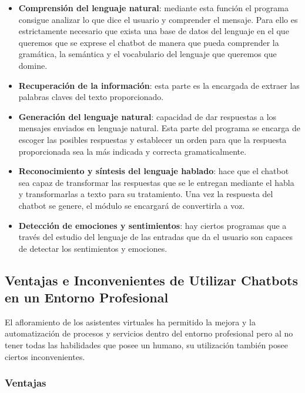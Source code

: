 \begin{itemize}
    \item \textbf{Comprensión del lenguaje natural}: mediante esta función el programa consigue analizar lo que dice el usuario y comprender el mensaje. Para ello es estrictamente necesario que exista una base de datos del lenguaje en el que queremos que se exprese el chatbot de manera que pueda comprender la gramática, la semántica y el vocabulario del lenguaje que queremos que domine.
    \item \textbf{Recuperación de la información}: esta parte es la encargada de extraer las palabras claves del texto proporcionado.
    \item \textbf{Generación del lenguaje natural}: capacidad de dar respuestas a los mensajes enviados en lenguaje natural. Esta parte del programa se encarga de escoger las posibles respuestas y establecer un orden para que la respuesta proporcionada sea la más indicada y correcta gramaticalmente.
    \item \textbf{Reconocimiento y síntesis del lenguaje hablado}: hace que el chatbot sea capaz de transformar las respuestas que se le entregan mediante el habla y transformarlas a texto para su tratamiento. Una vez la respuesta del chatbot se genere, el módulo se encargará de convertirla a voz.
    \item \textbf{Detección de emociones y sentimientos}: hay ciertos programas que a través del estudio del lenguaje de las entradas que da el usuario son capaces de detectar los sentimientos y emociones.
\end{itemize}

\subsection{Ventajas e Inconvenientes de Utilizar Chatbots en un Entorno Profesional}
El afloramiento de los asistentes virtuales ha permitido la mejora y la automatización de procesos y servicios dentro del entorno profesional pero al no tener todas las habilidades que posee un humano, su utilización también posee ciertos inconvenientes.

\subsubsection{Ventajas}

